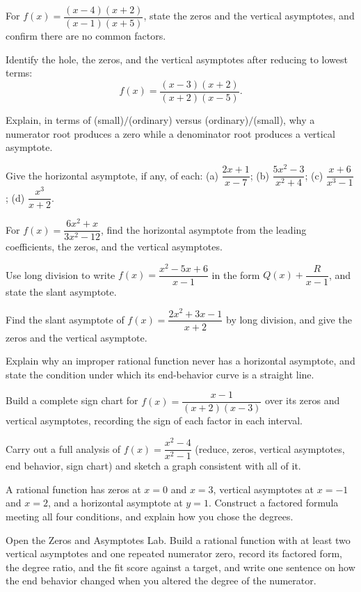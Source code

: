 \documentclass[12pt]{book}
\begin{document}
\begin{exercises}
\item For $f(x)=\dfrac{(x-4)(x+2)}{(x-1)(x+5)}$, state the zeros and the vertical
asymptotes, and confirm there are no common factors.

\item Identify the hole, the zeros, and the vertical asymptotes after reducing to lowest terms:
\[
f(x)=\frac{(x-3)(x+2)}{(x+2)(x-5)}.
\]

\item Explain, in terms of (small)$/$(ordinary) versus (ordinary)$/$(small), why a
numerator root produces a zero while a denominator root produces a vertical
asymptote.

\item Give the horizontal asymptote, if any, of each:
(a) $\dfrac{2x+1}{x-7}$; (b) $\dfrac{5x^2-3}{x^2+4}$; (c) $\dfrac{x+6}{x^3-1}$;
(d) $\dfrac{x^3}{x+2}$.

\item For $f(x)=\dfrac{6x^2+x}{3x^2-12}$, find the horizontal asymptote from the
leading coefficients, the zeros, and the vertical asymptotes.

\item Use long division to write $f(x)=\dfrac{x^2-5x+6}{x-1}$ in the form
$Q(x)+\dfrac{R}{x-1}$, and state the slant asymptote.

\item Find the slant asymptote of $f(x)=\dfrac{2x^2+3x-1}{x+2}$ by long division, and
give the zeros and the vertical asymptote.

\item Explain why an improper rational function never has a horizontal asymptote, and
state the condition under which its end-behavior curve is a straight line.

\item Build a complete sign chart for $f(x)=\dfrac{x-1}{(x+2)(x-3)}$ over its zeros
and vertical asymptotes, recording the sign of each factor in each interval.

\item Carry out a full analysis of $f(x)=\dfrac{x^2-4}{x^2-1}$ (reduce, zeros,
vertical asymptotes, end behavior, sign chart) and sketch a graph consistent with all
of it.

\item A rational function has zeros at $x=0$ and $x=3$, vertical asymptotes at
$x=-1$ and $x=2$, and a horizontal asymptote at $y=1$. Construct a factored formula
meeting all four conditions, and explain how you chose the degrees.

\item Open the Zeros and Asymptotes Lab. Build a rational function with at least two
vertical asymptotes and one repeated numerator zero, record its factored form, the
degree ratio, and the fit score against a target, and write one sentence on how the
end behavior changed when you altered the degree of the numerator.
\end{exercises}
\end{document}
